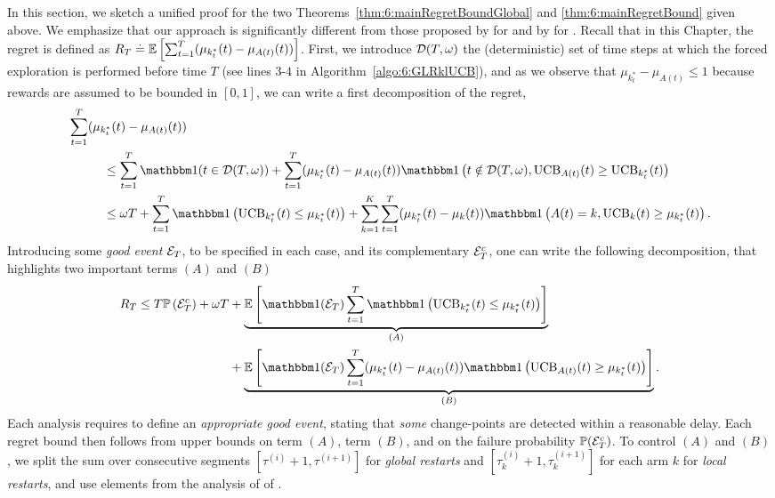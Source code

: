 In this section, we sketch a unified proof for the two Theorems~\ref{thm:6:mainRegretBoundGlobal} and \ref{thm:6:mainRegretBound} given above.
We emphasize that our approach is significantly different from those proposed by \cite{CaoZhenKvetonXie18} for \MUCB{} and by \cite{LiuLeeShroff17} for \CUSUMUCB.
%
Recall that in this Chapter, the regret is defined as $R_T \overset{.}{=} \mathbb{E}\left[\sum_{t=1}^T(\mu_{k_t^*}(t) - \mu_{A(t)}(t))\right]$.
First, we introduce $\mathcal{D}(T,\omega)$ the (deterministic) set of time steps at which the forced exploration is performed before time $T$ (see lines $3$-$4$ in Algorithm~\ref{algo:6:GLRklUCB}),
and as we observe that $\mu_{k_t^*} - \mu_{A(t)} \leq 1$ because rewards are assumed to be bounded in $[0,1]$,
we can write a first decomposition of the regret,
\begin{align*}
    & \sum_{t=1}^T (\mu_{k_t^*}(t) - \mu_{A(t)}(t)) \\
    & \hspace{1cm} \leq  \sum_{t=1}^{T} \indic(t \in \cD(T,\omega)) + \sum_{t=1}^T (\mu_{k_t^*}(t) - \mu_{A(t)}(t))\indic\left(t \notin\cD(T,\omega), \UCB_{A(t)}(t) \geq \UCB_{k_t^*}(t)\right) \\
    & \hspace{1cm}\leq  \omega T + \sum_{t=1}^T \indic\left(\UCB_{k_t^*}(t) \leq \mu_{k_t^*}(t)\right) + \sum_{k=1}^K\sum_{t=1}^T (\mu_{k_t^*}(t) - \mu_k(t))\indic\left(A(t) = k, \UCB_k(t) \geq \mu_{k_t^*}(t)\right).
\end{align*}
%
Introducing some \emph{good event} $\mathcal{E}_T$, to be specified in each case, and its complementary $\mathcal{E}_T^c$, one can write the following decomposition, that highlights two important terms $(A)$ and $(B)$
%
\begin{align}\label{eq:6:GeneRegretBound}
    R_T \leq T \bP\left(\cE_T^c\right) + \omega T & + \underbrace{\bE\left[\indic(\cE_T) \sum_{t=1}^T \indic\left(\UCB_{k_t^*}(t) \leq \mu_{k_t^*}(t)\right)\right]}_{(A)} \\
    & + \underbrace{\bE\left[\indic(\cE_T)\sum_{t=1}^T (\mu_{k_t^*}(t) - \mu_{A(t)}(t))\indic\left(\UCB_{A(t)}(t) \geq \mu_{k_t^*}(t)\right)\right]}_{(B)}. \nonumber
\end{align}
%
Each analysis requires to define an \emph{appropriate good event}, stating that \emph{some} change-points are detected within a reasonable delay. Each regret bound then follows from upper bounds on term $(A)$, term $(B)$, and on the failure probability $\mathbb{P}(\mathcal{E}_T^c)$.
%
To control $(A)$ and $(B)$, we split the sum over consecutive segments $[\tau^{(i)}+1, \tau^{(i+1)}]$ for \emph{global restarts} and $[\tau^{(i)}_k+1, \tau^{(i+1)}_k]$ for each arm $k$ for \emph{local restarts}, and use elements from the analysis of \klUCB{} of \cite{KLUCBJournal}.

